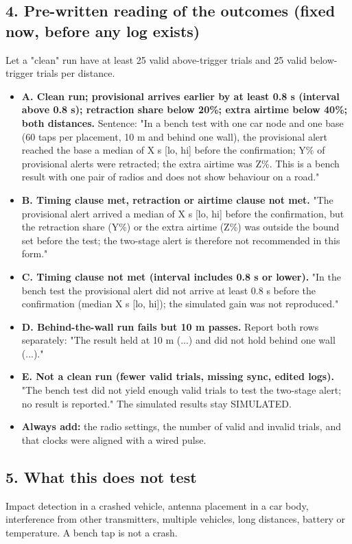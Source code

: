 \subsection*{4. Pre-written reading of the outcomes (fixed now, before any log exists)}
Let a "clean" run have at least 25 valid above-trigger trials and 25 valid below-trigger trials per distance.
\begin{itemize}
\item \textbf{A. Clean run; provisional arrives earlier by at least 0.8 s (interval above 0.8 s); retraction share below 20\%; extra airtime below 40\%; both distances.} Sentence: "In a bench test with one car node and one base (60 taps per placement, 10 m and behind one wall), the provisional alert reached the base a median of X s [lo, hi] before the confirmation; Y\% of provisional alerts were retracted; the extra airtime was Z\%. This is a bench result with one pair of radios and does not show behaviour on a road."
\item \textbf{B. Timing clause met, retraction or airtime clause not met.} "The provisional alert arrived a median of X s [lo, hi] before the confirmation, but the retraction share (Y\%) or the extra airtime (Z\%) was outside the bound set before the test; the two-stage alert is therefore not recommended in this form."
\item \textbf{C. Timing clause not met (interval includes 0.8 s or lower).} "In the bench test the provisional alert did not arrive at least 0.8 s before the confirmation (median X s [lo, hi]); the simulated gain was not reproduced."
\item \textbf{D. Behind-the-wall run fails but 10 m passes.} Report both rows separately: "The result held at 10 m (...) and did not hold behind one wall (...)."
\item \textbf{E. Not a clean run (fewer valid trials, missing sync, edited logs).} "The bench test did not yield enough valid trials to test the two-stage alert; no result is reported." The simulated results stay SIMULATED.
\item \textbf{Always add:} the radio settings, the number of valid and invalid trials, and that clocks were aligned with a wired pulse.
\end{itemize}

\subsection*{5. What this does not test}
Impact detection in a crashed vehicle, antenna placement in a car body, interference from other transmitters, multiple vehicles, long distances, battery or temperature. A bench tap is not a crash.

